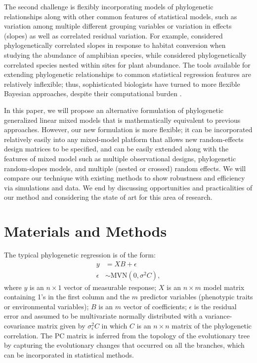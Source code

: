 The second challenge is flexibly incorporating models of phylogenetic relationships along with other common features of statistical models, such as variation among multiple different grouping variables or variation in effects (slopes) as well as correlated residual variation.
For example, \cite{nowakowski2018phylogenetic} considered phylogenetically correlated slopes in response to habitat conversion when studying the abundance of amphibian species, while \cite{li2017canfun} considered phylogenetically correlated species nested within sites for plant abundance. 
The tools available for extending phylogenetic relationships to common statistical regression features are relatively inflexible; thus, sophisticated biologists have turned to more flexible Bayesian approaches, despite their computational burden \cite{hadfield2010mcmc, burkner2016brms}.

In this paper, we will propose an alternative formulation of phylogenetic generalized linear mixed models that is mathematically equivalent to previous approaches.
However, our new formulation is more flexible; it can be incorporated relatively easily into any mixed-model platform that allows new random-effects design matrices to be specified, and can be easily extended along with the features of mixed model such as multiple observational designs, phylogenetic random-slopes models, and multiple (nested or crossed) random effects.
We will compare our technique with existing methods to show robustness and efficiency via simulations and data.
We end by discussing opportunities and practicalities of our method and considering the state of art for this area of research. 

\section{Materials and Methods}

The typical phylogenetic regression is of the form:
\begin{align}
y & = XB + \epsilon \label{eq:gls1} \\ 
\epsilon & \sim \textrm{MVN}(0,\sigma^{2}C), \label{eq:gls2}
\end{align}
where $y$ is an $n \times 1$ vector of measurable response; $X$ is an $n \times m$ model matrix containing 1's in the first column and the $m$ predictor variables (phenotypic traits or environmental variables); $B$ is an $m$ vector of coefficients; $\epsilon$ is the residual error and assumed to be multivariate normally distributed with a variance-covariance matrix given by $\sigma^{2}_{\epsilon}C$ in which $C$ is an $n \times n$ matrix of the phylogenetic correlation.
The PC matrix is inferred from the topology of the evolutionary tree by capturing the evolutionary changes that occurred on all the branches, which can be incorporated in statistical methods.

